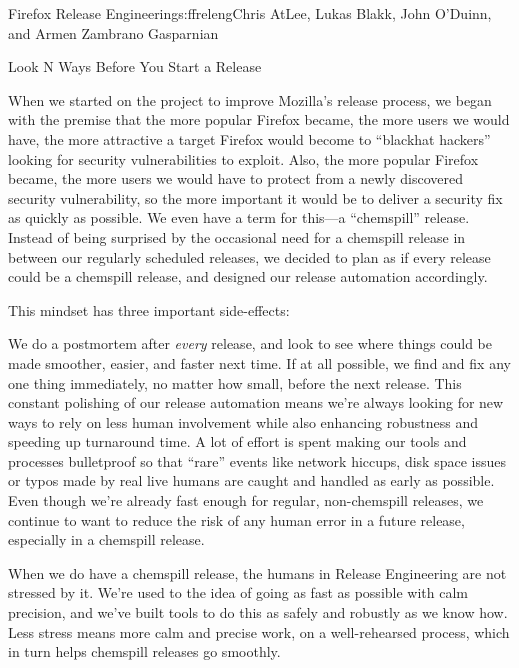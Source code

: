 \begin{aosachapter}{Firefox Release Engineering}{s:ffreleng}{Chris AtLee, Lukas Blakk, John O'Duinn, and Armen Zambrano Gasparnian}
\begin{aosasect1}{Look N Ways Before You Start a Release}

When we started on the project to improve Mozilla's release process,
we began with the premise that the more popular Firefox became, the
more users we would have, the more attractive a target Firefox would
become to ``blackhat hackers'' looking for security vulnerabilities to
exploit. Also, the more popular Firefox became, the more users we
would have to protect from a newly discovered security vulnerability,
so the more important it would be to deliver a security fix as quickly
as possible. We even have a term for this---a ``chemspill''
release. Instead of being surprised by the occasional need for a
chemspill release in between our regularly scheduled releases, we
decided to plan as if every release could be a chemspill release, and
designed our release automation accordingly.

This mindset has three important side-effects:

\begin{aosaenumerate}

\item We do a postmortem after \emph{every} release, and look to see
  where things could be made smoother, easier, and faster next
  time. If at all possible, we find and fix any one thing immediately,
  no matter how small, before the next release. This constant
  polishing of our release automation means we're always looking for
  new ways to rely on less human involvement while also enhancing
  robustness and speeding up turnaround time. A lot of effort is spent
  making our tools and processes bulletproof so that ``rare'' events
  like network hiccups, disk space issues or typos made by real live
  humans are caught and handled as early as possible.  Even though
  we're already fast enough for regular, non-chemspill releases, we
  continue to want to reduce the risk of any human error in a future
  release, especially in a chemspill release.

\item When we do have a chemspill release, the humans in Release
  Engineering are not stressed by it. We're used to the idea of going
  as fast as possible with calm precision, and we've built tools to do
  this as safely and robustly as we know how. Less stress means more
  calm and precise work, on a well-rehearsed process, which in turn
  helps chemspill releases go smoothly.


\end{aosaenumerate}
\end{aosasect1}
\end{aosachapter}
